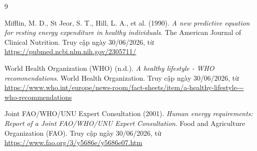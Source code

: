 \documentclass[12pt, a4paper]{report}
\begin{document}
\clearpage
{}
\renewcommand{\bibname}{\centering TÀI LIỆU THAM KHẢO}
\makeatletter
\renewcommand\@biblabel[1]{}
\makeatother
\begin{thebibliography}{9}

Mifflin, M. D., St Jeor, S. T., Hill, L. A., et al. (1990).
\textit{A new predictive equation for resting energy expenditure in healthy individuals}.
The American Journal of Clinical Nutrition.
Truy cập ngày 30/06/2026, từ \url{https://pubmed.ncbi.nlm.nih.gov/2305711/}

World Health Organization (WHO) (n.d.).
\textit{A healthy lifestyle - WHO recommendations}.
World Health Organization.
Truy cập ngày 30/06/2026, từ \url{https://www.who.int/europe/news-room/fact-sheets/item/a-healthy-lifestyle---who-recommendations}

Joint FAO/WHO/UNU Expert Consultation (2001).
\textit{Human energy requirements: Report of a Joint FAO/WHO/UNU Expert Consultation}.
Food and Agriculture Organization (FAO).
Truy cập ngày 30/06/2026, từ \url{https://www.fao.org/3/y5686e/y5686e07.htm}

\end{thebibliography}
\end{document}
